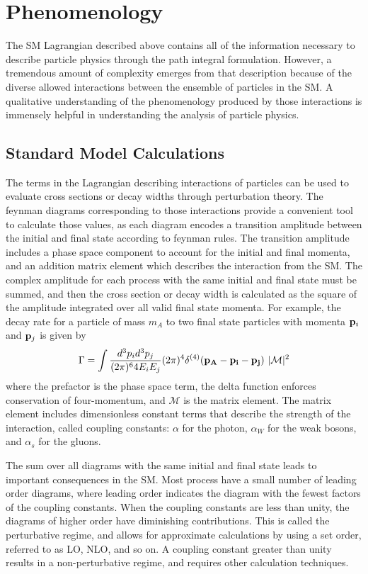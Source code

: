 \section{Phenomenology}

The \ac{SM} Lagrangian described above contains all of the information necessary to describe particle physics through the path integral formulation. 
However, a tremendous amount of complexity emerges from that description because of the diverse allowed interactions between the ensemble of particles in the \ac{SM}.
A qualitative understanding of the phenomenology produced by those interactions is immensely helpful in understanding the analysis of particle physics.

\subsection{Standard Model Calculations}
\label{sec:smcalc}

The terms in the Lagrangian describing interactions of particles can be used to evaluate cross sections or decay widths through perturbation theory.
The feynman diagrams corresponding to those interactions provide a convenient tool to calculate those values, as each diagram encodes a transition amplitude between the initial and final state according to feynman rules.
The transition amplitude includes a phase space component to account for the initial and final momenta, and an addition matrix element which describes the interaction from the \ac{SM}.
The complex amplitude for each process with the same initial and final state must be summed, and then the cross section or decay width is calculated as the square of the amplitude integrated over all valid final state momenta.
For example, the decay rate for a particle of mass $m_A$ to two final state particles with momenta $\mathbf{p}_i$ and $\mathbf{p}_j$ is given by
\begin{align*}
\Gamma = \int \frac{d^3p_i d^3 p_j}{(2\pi)^6 4E_i E_j} (2\pi)^4 \delta^{(4)}(\mathbf{p_A} - \mathbf{p_i} - \mathbf{p_j})\ |\mathcal{M}|^2 
\end{align*}
where the prefactor is the phase space term, the delta function enforces conservation of four-momentum, and $\mathcal{M}$ is the matrix element.
The matrix element includes dimensionless constant terms that describe the strength of the interaction, called coupling constants: $\alpha$ for the photon, $\alpha_W$ for the weak bosons, and $\alpha_s$ for the gluons.

The sum over all diagrams with the same initial and final state leads to important consequences in the \ac{SM}.
Most process have a small number of leading order diagrams, where leading order indicates the diagram with the fewest factors of the coupling constants.
When the coupling constants are less than unity, the diagrams of higher order have diminishing contributions.
This is called the perturbative regime, and allows for approximate calculations by using a set order, referred to as \ac{LO}, \ac{NLO}, and so on.
A coupling constant greater than unity results in a non-perturbative regime, and requires other calculation techniques.

